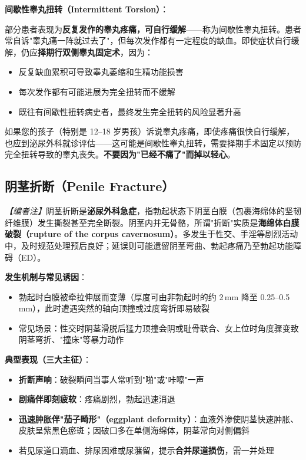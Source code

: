 \vspace{0.5em}
\noindent\textbf{间歇性睾丸扭转（Intermittent Torsion）}：

部分患者表现为\textbf{反复发作的睾丸疼痛，可自行缓解}——称为间歇性睾丸扭转。患者常自诉"睾丸痛一阵就过去了"，但每次发作都有一定程度的缺血。即使症状自行缓解，仍应\textbf{择期行双侧睾丸固定术}，因为：
\begin{itemize}[leftmargin=2cm]
	\item 反复缺血累积可导致睾丸萎缩和生精功能损害
	\item 每次发作都有可能进展为完全扭转而不缓解
	\item 既往有间歇性扭转病史者，最终发生完全扭转的风险显著升高
\end{itemize}

\begin{tcolorbox}[colback=pink!5!white,colframe=red!50!black,title=贴心小叮咛]
如果您的孩子（特别是 12--18 岁男孩）诉说睾丸疼痛，即使疼痛很快自行缓解，也应到泌尿外科就诊评估——这可能是间歇性睾丸扭转，需要择期手术固定以预防完全扭转导致的睾丸丧失。\textbf{不要因为"已经不痛了"而掉以轻心}。
\end{tcolorbox}

\subsection{阴茎折断（Penile Fracture）}
\label{subsec:penile_fracture}

\noindent\textit{【编者注】}阴茎折断是\textbf{泌尿外科急症}，指勃起状态下阴茎白膜（包裹海绵体的坚韧纤维膜）发生撕裂甚至完全断裂。阴茎内并无骨骼，所谓"折断"实质是\textbf{海绵体白膜破裂（rupture of the corpus cavernosum）}。多发生于性交、手淫等剧烈活动中，及时规范处理预后良好；延误则可能遗留阴茎弯曲、勃起疼痛乃至勃起功能障碍（ED）。

\vspace{0.5em}
\noindent\textbf{发生机制与常见诱因}：
\begin{itemize}[leftmargin=2cm]
	\item 勃起时白膜被牵拉伸展而变薄（厚度可由非勃起时的约 2\,mm 降至 0.25--0.5\,mm），此时遭遇突然的轴向顶撞或过度弯折即易破裂
	\item 常见场景：性交时阴茎滑脱后猛力顶撞会阴或耻骨联合、女上位时角度骤变致阴茎弯折、"撞床"等暴力动作
\end{itemize}

\vspace{0.5em}
\noindent\textbf{典型表现（三大主征）}：
\begin{itemize}[leftmargin=2cm]
	\item \textbf{折断声响}：破裂瞬间当事人常听到"啪"或"咔嚓"一声
	\item \textbf{剧痛伴即刻疲软}：疼痛剧烈，勃起迅速消退
	\item \textbf{迅速肿胀伴"茄子畸形"（eggplant deformity）}：血液外渗使阴茎快速肿胀、皮肤呈紫黑色瘀斑；因破口多在单侧海绵体，阴茎常向对侧偏斜
	\item 若见尿道口滴血、排尿困难或尿潴留，提示\textbf{合并尿道损伤}，需一并处理
\end{itemize}

